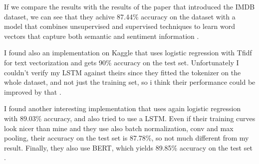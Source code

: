 \documentclass{article}
\begin{document}
If we compare the results with the results of the paper that introduced the IMDB dataset, we can see that they achive 87.44\% accuracy on the dataset with a model that combines unsupervised and supervised techniques to learn word vectors that capture both semantic and sentiment information \cite{imdb_dataset_stanfordnlp}.

I found also an implementation on Kaggle that uses logistic regression with Tfidf for text vectorization and gets 90\% accuracy on the test set. Unfortunately I couldn't verify my LSTM against theirs since they fitted the tokenizer on the whole dataset, and not just the training set, so i think their performance could be improved by that \cite{kaggleIMDbSentiment}.

I found another interesting implementation that uses again logistic regression with 89.03\% accuracy, and also tried to use a LSTM.
Even if their training curves look nicer than mine and they use also batch normalization, conv and max pooling, their accuracy on the test set is 87.78\%, so not much different from my result.
Finally, they also use BERT, which yields 89.85\% accuracy on the test set \cite{kaggleIMDBSentimentLSTMandBERT}.



\end{document}
